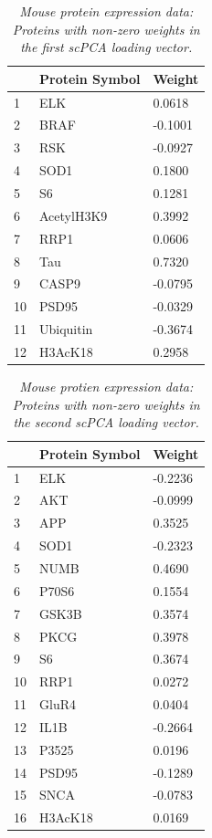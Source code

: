 \documentclass{article}
\begin{document}
\begin{longtable}{| l | p{4cm} | l |}
  \caption{{\em Mouse protein expression data: Proteins with non-zero weights in the first scPCA loading vector.}} \label{tab:mouse_prot_1} \\
  \hline
   & Protein Symbol & Weight \\ 
 \hline
  1 & ELK & 0.0618 \\ 
  2 & BRAF & -0.1001 \\ 
  3 & RSK & -0.0927 \\ 
  4 & SOD1 & 0.1800 \\ 
  5 & S6 & 0.1281 \\ 
  6 & AcetylH3K9 & 0.3992 \\ 
  7 & RRP1 & 0.0606 \\ 
  8 & Tau & 0.7320 \\ 
  9 & CASP9 & -0.0795 \\ 
  10 & PSD95 & -0.0329 \\ 
  11 & Ubiquitin & -0.3674 \\ 
  12 & H3AcK18 & 0.2958 \\ 
 \hline
\end{longtable}

\newpage
\begin{longtable}{| l | p{4cm} | l |}
  \caption{{\em Mouse protien expression data: Proteins with non-zero weights in the second scPCA loading vector.}}
  \label{tab:mouse_prot_2} \\
  \hline
 & Protein Symbol & Weight \\ 
 \hline
  1 & ELK & -0.2236 \\ 
  2 & AKT & -0.0999 \\ 
  3 & APP & 0.3525 \\ 
  4 & SOD1 & -0.2323 \\ 
  5 & NUMB & 0.4690 \\ 
  6 & P70S6 & 0.1554 \\ 
  7 & GSK3B & 0.3574 \\ 
  8 & PKCG & 0.3978 \\ 
  9 & S6 & 0.3674 \\ 
  10 & RRP1 & 0.0272 \\ 
  11 & GluR4 & 0.0404 \\ 
  12 & IL1B & -0.2664 \\ 
  13 & P3525 & 0.0196 \\ 
  14 & PSD95 & -0.1289 \\ 
  15 & SNCA & -0.0783 \\ 
  16 & H3AcK18 & 0.0169 \\ 
 \hline
 \end{longtable}
 
\end{document}
